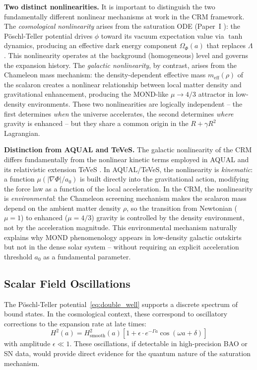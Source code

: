 \documentclass[aps,prd,twocolumn,superscriptaddress,nofootinbib]{revtex4-2}
\begin{document}
\textbf{Two distinct nonlinearities.} It is important to distinguish the two fundamentally different nonlinear mechanisms at work in the CRM framework. The \textit{cosmological nonlinearity} arises from the saturation ODE (Paper~I \cite{Geiger2026}): the P\"oschl-Teller potential drives $\phi$ toward its vacuum expectation value via $\tanh$ dynamics, producing an effective dark energy component $\Omega_\Phi(a)$ that replaces $\Lambda$. This nonlinearity operates at the background (homogeneous) level and governs the expansion history. The \textit{galactic nonlinearity}, by contrast, arises from the Chameleon mass mechanism: the density-dependent effective mass $m_{\mathrm{eff}}(\rho)$ of the scalaron creates a nonlinear relationship between local matter density and gravitational enhancement, producing the MOND-like $\mu \to 4/3$ attractor in low-density environments. These two nonlinearities are logically independent -- the first determines \textit{when} the universe accelerates, the second determines \textit{where} gravity is enhanced -- but they share a common origin in the $R + \gamma R^2$ Lagrangian.

\textbf{Distinction from AQUAL and TeVeS.} The galactic nonlinearity of the CRM differs fundamentally from the nonlinear kinetic terms employed in AQUAL \cite{BekensteinMilgrom1984} and its relativistic extension TeVeS \cite{Bekenstein2004}. In AQUAL/TeVeS, the nonlinearity is \textit{kinematic}: a function $\mu(|\nabla\Phi|/a_0)$ is built directly into the gravitational action, modifying the force law as a function of the local acceleration. In the CRM, the nonlinearity is \textit{environmental}: the Chameleon screening mechanism makes the scalaron mass depend on the ambient matter density $\rho$, so the transition from Newtonian ($\mu = 1$) to enhanced ($\mu = 4/3$) gravity is controlled by the density environment, not by the acceleration magnitude. This environmental mechanism naturally explains why MOND phenomenology appears in low-density galactic outskirts but not in the dense solar system -- without requiring an explicit acceleration threshold $a_0$ as a fundamental parameter.

\subsection{Scalar Field Oscillations}

The P\"oschl-Teller potential~\eqref{eq:double_well} supports a discrete spectrum of bound states. In the cosmological context, these correspond to oscillatory corrections to the expansion rate at late times:
\begin{equation}
H^2(a) = H^2_{\mathrm{smooth}}(a) \left[1 + \epsilon \cdot e^{-\Gamma a} \cos(\omega a + \delta)\right]
\end{equation}
with amplitude $\epsilon \ll 1$. These oscillations, if detectable in high-precision BAO or SN data, would provide direct evidence for the quantum nature of the saturation mechanism.
\end{document}

